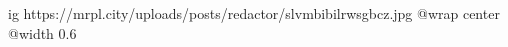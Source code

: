  
 
 
 
 

\ifcmt
  ig https://mrpl.city/uploads/posts/redactor/slvmbibilrwsgbcz.jpg
  @wrap center
  @width 0.6
\fi
